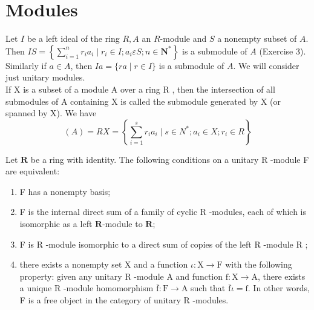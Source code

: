 




\section{Modules}

Let $I$ be a left ideal of the ring $R, A$ an $R$-module and $S$ a nonempty subset of $A$. Then $I S=\left\{\sum_{i=1}^n r_i a_i \mid r_i \in I ; a_i \varepsilon S ; n \in \mathbf{N}^*\right\}$ is a submodule of $A$ (Exercise 3). Similarly if $a \in A$, then $I a=\{r a \mid r \in I\}$ is a submodule of $A$. We will consider just unitary modules.\\

If X is a subset of a module A over a ring R , then the intersection of all submodules of A containing X is called the submodule generated by X (or spanned by X). We have $$(A)=R X=\left\{\sum_{i=1}^s r_i a_i \mid s \in N^* ; a_i \in X ; r_i \in R\right\}$$

\begin{theo} Let $\mathbf{R}$ be a ring with identity. The following conditions on a unitary R -module F are equivalent:
    \begin{enumerate}
        \item F has a nonempty basis;
        \item F is the internal direct sum of a family of cyclic R -modules, each of which is isomorphic as a left $\mathbf{R}$-module to $\mathbf{R}$;
        \item F is R -module isomorphic to a direct sum of copies of the left R -module R ;
        \item there exists a nonempty set X and a function $\iota: \mathrm{X} \rightarrow \mathrm{F}$ with the following property: given any unitary R -module A and function $\mathrm{f}: \mathrm{X} \rightarrow \mathrm{A}$, there exists a unique R -module homomorphism $\overline{\mathrm{f}}: \mathrm{F} \rightarrow \mathrm{A}$ such that $\overline{\mathrm{f}} \iota=\mathrm{f}$. In other words, F is a free object in the category of unitary R -modules.
    \end{enumerate}
\end{theo}

